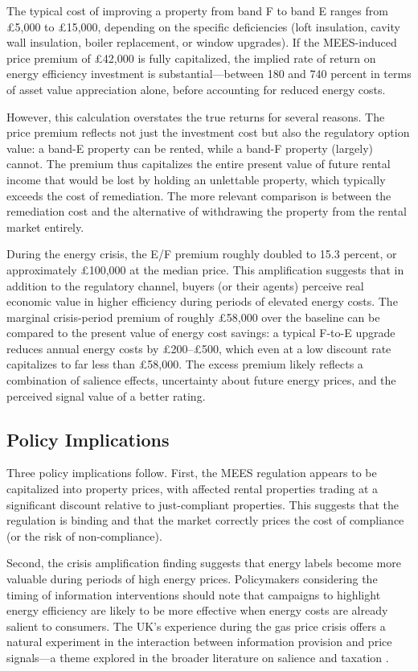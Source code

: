 \documentclass[12pt]{article}
\begin{document}
The typical cost of improving a property from band F to band E ranges from \pounds 5,000 to \pounds 15,000, depending on the specific deficiencies (loft insulation, cavity wall insulation, boiler replacement, or window upgrades). If the MEES-induced price premium of \pounds 42,000 is fully capitalized, the implied rate of return on energy efficiency investment is substantial---between 180 and 740 percent in terms of asset value appreciation alone, before accounting for reduced energy costs.

However, this calculation overstates the true returns for several reasons. The price premium reflects not just the investment cost but also the regulatory option value: a band-E property can be rented, while a band-F property (largely) cannot. The premium thus capitalizes the entire present value of future rental income that would be lost by holding an unlettable property, which typically exceeds the cost of remediation. The more relevant comparison is between the remediation cost and the alternative of withdrawing the property from the rental market entirely.

During the energy crisis, the E/F premium roughly doubled to 15.3 percent, or approximately \pounds 100,000 at the median price. This amplification suggests that in addition to the regulatory channel, buyers (or their agents) perceive real economic value in higher efficiency during periods of elevated energy costs. The marginal crisis-period premium of roughly \pounds 58,000 over the baseline can be compared to the present value of energy cost savings: a typical F-to-E upgrade reduces annual energy costs by \pounds 200--\pounds 500, which even at a low discount rate capitalizes to far less than \pounds 58,000. The excess premium likely reflects a combination of salience effects, uncertainty about future energy prices, and the perceived signal value of a better rating.

\subsection{Policy Implications}

Three policy implications follow. First, the MEES regulation appears to be capitalized into property prices, with affected rental properties trading at a significant discount relative to just-compliant properties. This suggests that the regulation is binding and that the market correctly prices the cost of compliance (or the risk of non-compliance).

Second, the crisis amplification finding suggests that energy labels become more valuable during periods of high energy prices. Policymakers considering the timing of information interventions should note that campaigns to highlight energy efficiency are likely to be more effective when energy costs are already salient to consumers. The UK's experience during the gas price crisis offers a natural experiment in the interaction between information provision and price signals---a theme explored in the broader literature on salience and taxation \citep{chetty2009salience}.
\end{document}
